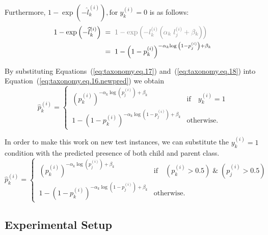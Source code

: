 \documentclass[review,1p,times,numbers]{elsarticle}
\begin{document}
Furthermore, $1-\exp{\left(-{\widehat l}_k^{(i)}\right)},\text{for}\; y_k^{(i)}=0 $ is as follows:
\begin{align}
    \label{eq:taxonomy.eq.18}
    1-\exp{\left(-{\widehat l}_k^{(i)}\right)}
    & \; = \; \textcolor{gray}{1-\exp{\left(-l_k^{(i)}\left(\alpha_k\;l_j^{(i)}+\beta_k\right)\right)} \nonumber}
    \\
    & \; = \; {1-\left(1-p_k^{(i)}\right)}^{-\alpha_k{\log{\left(1-p_j^{(i)}\right)}}+\beta_k}
\end{align}

By substituting Equations~(\ref{eq:taxonomy.eq.17}) and~(\ref{eq:taxonomy.eq.18})  into Equation~(\ref{eq:taxonomy.eq.16.newpred})  we obtain
\begin{equation}
    \label{eq:taxonomy.eq.19.newpred}
    \widehat{p}_k^{(i)} =
    \begin{cases}
        \, {\left( p_k^{(i)} \right)}^{-\alpha_k \log(p_j^{(i)}) + \beta_k}
        &
        \text{if} \quad y_k^{(i)} = 1
        \\
        \, 1 - {\left( 1 - p_k^{(i)} \right)}^{-\alpha_k \log{\left( 1 - p_j^{(i)} \right)} + \beta_k}
        &
        \text{otherwise.}
    \end{cases}
\end{equation}

In order to make this work on new test instances, we can substitute the $y_{k}^{(i)}=1$ condition with the predicted presence of both child and parent class.
\begin{equation}
    \label{eq:taxonomy.eq.19.newpred_wo_groundtruth}
    \widehat{p}_k^{(i)} =
    \begin{cases}
        \, {\left( p_k^{(i)} \right)}^{-\alpha_k \log(p_j^{(i)}) + \beta_k}
        &
        \text{if} \quad (p_k^{(i)} > 0.5) \; \& \; (p_j^{(i)} > 0.5)
        \\
        \, 1 - {\left( 1 - p_k^{(i)} \right)}^{-\alpha_k \log{\left( 1 - p_j^{(i)} \right)} + \beta_k}
        &
        \text{otherwise.}
    \end{cases}
\end{equation}

\subsection{Experimental Setup}
\end{document}
